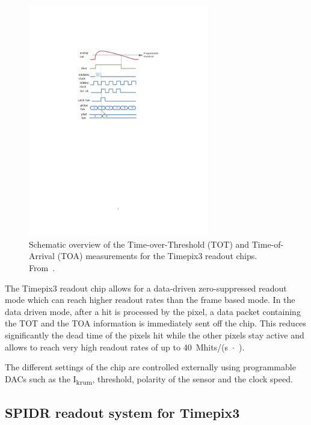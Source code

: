 \begin{figure}[htbp]
  \centering \includegraphics[width=0.7\textwidth, trim = 50mm 140mm
    60mm 50mm, clip]{figures/Calibration/TOT_TOA_explanation.pdf}
  \caption{Schematic overview of the Time-over-Threshold (TOT) and
    Time-of-Arrival (TOA) measurements for the Timepix3 readout
    chips. From~\cite{Timepix3Poikela}.}
  \label{fig:TOT_TOA_concept}
\end{figure}

The Timepix3 readout chip allows for a data-driven zero-suppressed
readout mode which can reach higher readout rates than the frame based
mode. In the data driven mode, after a hit is processed by the pixel,
a data packet containing the TOT and the TOA information is
immediately sent off the chip. This reduces significantly the dead
time of the pixels hit while the other pixels stay active and allows
to reach very high readout rates of up to
40~Mhits/(s~$\cdot$~\cmsquared).

The different settings of the chip are controlled externally using
programmable DACs such as the I\textsubscript{krum}, threshold,
polarity of the sensor and the clock speed.



\subsection{SPIDR readout system for Timepix3}
\label{sec:TimepixReadout}

